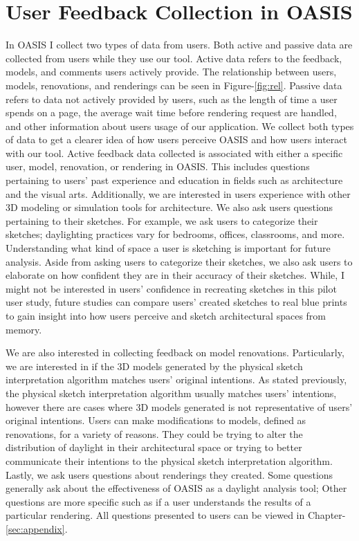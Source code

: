 \section{User Feedback  Collection in OASIS}
	In OASIS I collect two types of data from users. Both active and passive data are collected from users while they use our tool. Active data refers to the feedback, models, and comments users actively provide. The relationship between users, models, renovations, and renderings can be seen in Figure-\ref{fig:rel}. Passive data refers to data not actively provided by users, such as the length of time a user spends on a page, the average wait time before rendering request are handled, and other information about users usage of our application. We collect both types of data to get a clearer idea of how users perceive OASIS and how users interact with our tool. Active feedback data collected is associated with either a specific user, model, renovation, or rendering in OASIS. This includes questions pertaining to users' past experience and education in fields such as architecture and the visual arts. Additionally, we are interested in users experience with other 3D modeling or simulation tools for architecture. We also ask users questions pertaining to their sketches. For example, we ask users to categorize their sketches; daylighting practices vary for bedrooms, offices, classrooms, and more. Understanding what kind of space a user is sketching is important for future analysis.	Aside from asking users to categorize their sketches, we also ask users to elaborate on how confident they are in their accuracy of their sketches.  While, I might not be interested in users' confidence in recreating sketches in this pilot user study, future studies can compare users' created sketches to real blue prints to gain insight into how users perceive and sketch architectural spaces from memory.

	We are also interested in collecting feedback on model renovations. Particularly, we are interested in if the 3D models generated by the physical sketch interpretation algorithm matches users' original intentions. As stated previously, the physical sketch interpretation algorithm usually matches users' intentions, however there are cases where  3D models generated is not representative of users' original intentions. Users can make modifications to models, defined as renovations, for a variety of reasons. They could be trying to alter the distribution of daylight in their architectural space or trying to better communicate their intentions to the physical sketch interpretation algorithm. Lastly, we ask users questions about renderings they created. Some questions generally ask about the effectiveness of OASIS as a daylight analysis tool; Other questions are more specific such as if a user understands the results of a particular rendering. All questions presented to users can be viewed in Chapter-\ref{sec:appendix}.

